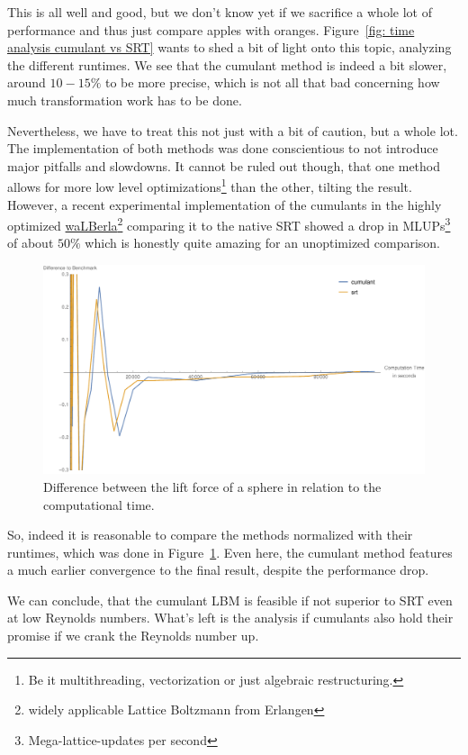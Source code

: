 This is all well and good, but we don't know yet if we sacrifice a whole lot of performance and thus just compare apples with oranges.
Figure~\ref{fig: time analysis cumulant vs SRT} wants to shed a bit of light onto this topic, analyzing the different runtimes.
We see that the cumulant method is indeed a bit slower, around $10-15\%$ to be more precise, which is not all that bad concerning how much transformation work has to be done.

Nevertheless, we have to treat this not just with a bit of caution, but a whole lot.
The implementation of both methods was done conscientious to not introduce major pitfalls and slowdowns.
It cannot be ruled out though, that one method allows for more low level optimizations\footnote{Be it multithreading, vectorization or just algebraic restructuring.} than the other, tilting the result.
However, a recent experimental implementation of the cumulants in the highly optimized \href{http://walberla.net/index.html}{waLBerla}\footnote{widely applicable Lattice Boltzmann from Erlangen} comparing it to the native SRT showed a drop in MLUPs\footnote{Mega-lattice-updates per second} of about $50\%$ which is honestly quite amazing for an unoptimized comparison.

\begin{figure}
  \centering
  \includegraphics[width=\linewidth]{../figures/schaeferTurekLift_timeDifference.pdf} %
  \caption{Difference between the lift force of a sphere in relation to the computational time.}
\label{fig: schaefer turek time difference}
\end{figure}

So, indeed it is reasonable to compare the methods normalized with their runtimes, which was done in Figure~\ref{fig: schaefer turek time difference}.
Even here, the cumulant method features a much earlier convergence to the final result, despite the performance drop.


We can conclude, that the cumulant LBM is feasible if not superior to SRT even at low Reynolds numbers.
What's left is the analysis if cumulants also hold their promise if we crank the Reynolds number up.

